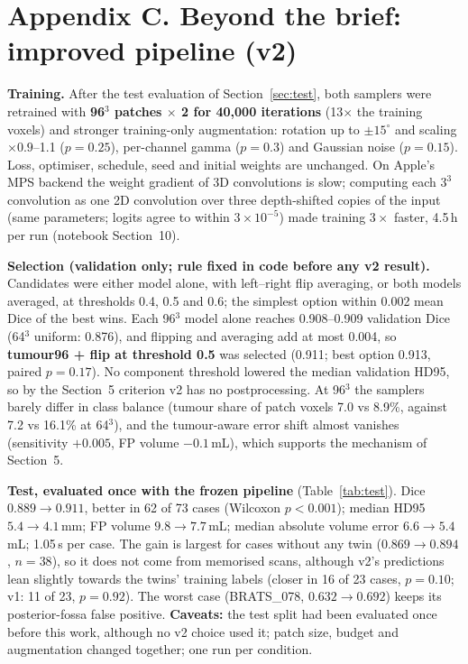 \documentclass[10pt,a4paper]{article}
\newcommand{\mL}{\,mL}
\newcommand{\mm}{\,mm}
\begin{document}
\section*{Appendix C. Beyond the brief: improved pipeline (v2)}\label{sec:v2}
\textbf{Training.} After the test evaluation of Section~\ref{sec:test}, both samplers were retrained with \textbf{96$^3$ patches $\times$ 2 for 40{,}000 iterations} (13$\times$ the training voxels) and stronger training-only augmentation: rotation up to $\pm15^\circ$ and scaling $\times0.9$--1.1 ($p=0.25$), per-channel gamma ($p=0.3$) and Gaussian noise ($p=0.15$). Loss, optimiser, schedule, seed and initial weights are unchanged. On Apple's MPS backend the weight gradient of 3D convolutions is slow; computing each $3^3$ convolution as one 2D convolution over three depth-shifted copies of the input (same parameters; logits agree to within $3\times10^{-5}$) made training $3\times$ faster, 4.5\,h per run (notebook Section~10).

\textbf{Selection (validation only; rule fixed in code before any v2 result).} Candidates were either model alone, with left--right flip averaging, or both models averaged, at thresholds 0.4, 0.5 and 0.6; the simplest option within 0.002 mean Dice of the best wins. Each 96$^3$ model alone reaches 0.908--0.909 validation Dice (64$^3$ uniform: 0.876), and flipping and averaging add at most 0.004, so \textbf{tumour96 + flip at threshold 0.5} was selected (0.911; best option 0.913, paired $p=0.17$). No component threshold lowered the median validation HD95, so by the Section~5 criterion v2 has no postprocessing. At 96$^3$ the samplers barely differ in class balance (tumour share of patch voxels 7.0 vs 8.9\%, against 7.2 vs 16.1\% at 64$^3$), and the tumour-aware error shift almost vanishes (sensitivity $+0.005$, FP volume $-0.1$\mL), which supports the mechanism of Section~5.

\textbf{Test, evaluated once with the frozen pipeline} (Table~\ref{tab:test}). Dice $0.889\to\mathbf{0.911}$, better in 62 of 73 cases (Wilcoxon $p<0.001$); median HD95 $5.4\to4.1$\mm; FP volume $9.8\to7.7$\mL; median absolute volume error $6.6\to5.4$\mL; 1.05\,s per case. The gain is largest for cases without any twin ($0.869\to0.894$, $n=38$), so it does not come from memorised scans, although v2's predictions lean slightly towards the twins' training labels (closer in 16 of 23 cases, $p=0.10$; v1: 11 of 23, $p=0.92$). The worst case (BRATS\_078, $0.632\to0.692$) keeps its posterior-fossa false positive. \textbf{Caveats:} the test split had been evaluated once before this work, although no v2 choice used it; patch size, budget and augmentation changed together; one run per condition.
\end{document}

